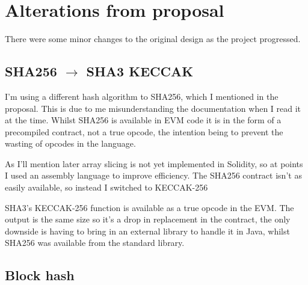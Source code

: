 \documentclass[12pt,a4paper,twoside,openright]{report}
\begin{document}






\section{Alterations from proposal}
\label{impl-changes}

There were some minor changes to the original design as the project progressed.

\subsection{SHA256 $\to$ SHA3 KECCAK}

I'm using a different hash algorithm to SHA256, which I mentioned in the proposal.
This is due to me misunderstanding the documentation when I read it at the time.
Whilst SHA256 is available in EVM code it is in the form of a precompiled contract, not a true opcode,
the intention being to prevent the wasting of opcodes in the language.

As I'll mention later array slicing is not yet implemented in Solidity, so at points I
used an assembly language to improve efficiency.
The SHA256 contract isn't as easily available, so instead I switched to KECCAK-256

SHA3's KECCAK-256 function is available as a true opcode in the EVM.
The output is the same size so it's a drop in replacement in the contract, the only downside is having to bring in an external library
to handle it in Java, whilst SHA256 was available from the standard library.

\subsection{Block hash}
\end{document}

